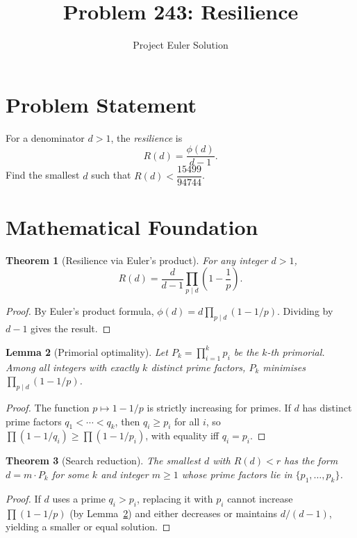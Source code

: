 \documentclass[12pt]{article}
\title{Problem 243: Resilience}
\author{Project Euler Solution}
\date{}
\newtheorem{theorem}{Theorem}
\newtheorem{lemma}[theorem]{Lemma}
\begin{document}
\maketitle

\section{Problem Statement}

For a denominator $d>1$, the \emph{resilience} is
\[
R(d)=\frac{\phi(d)}{d-1}.
\]
Find the smallest $d$ such that $R(d)<\dfrac{15499}{94744}$.

\section{Mathematical Foundation}

\begin{theorem}[Resilience via Euler's product]
For any integer $d>1$,
\[
R(d)=\frac{d}{d-1}\prod_{p\mid d}\!\left(1-\frac{1}{p}\right).
\]
\end{theorem}

\begin{proof}
By Euler's product formula, $\phi(d)=d\prod_{p\mid d}(1-1/p)$. Dividing by $d-1$ gives the result.
\end{proof}

\begin{lemma}[Primorial optimality]\label{lem:primorial}
Let $P_k=\prod_{i=1}^k p_i$ be the $k$-th primorial. Among all integers with exactly $k$ distinct prime factors, $P_k$ minimises $\prod_{p\mid d}(1-1/p)$.
\end{lemma}

\begin{proof}
The function $p\mapsto 1-1/p$ is strictly increasing for primes. If $d$ has distinct prime factors $q_1<\cdots<q_k$, then $q_i\ge p_i$ for all $i$, so $\prod(1-1/q_i)\ge\prod(1-1/p_i)$, with equality iff $q_i=p_i$.
\end{proof}

\begin{theorem}[Search reduction]\label{thm:search}
The smallest $d$ with $R(d)<r$ has the form $d=m\cdot P_k$ for some $k$ and integer $m\ge 1$ whose prime factors lie in $\{p_1,\ldots,p_k\}$.
\end{theorem}

\begin{proof}
If $d$ uses a prime $q_i>p_i$, replacing it with $p_i$ cannot increase $\prod(1-1/p)$ (by Lemma~\ref{lem:primorial}) and either decreases or maintains $d/(d-1)$, yielding a smaller or equal solution.
\end{proof}
\end{document}
